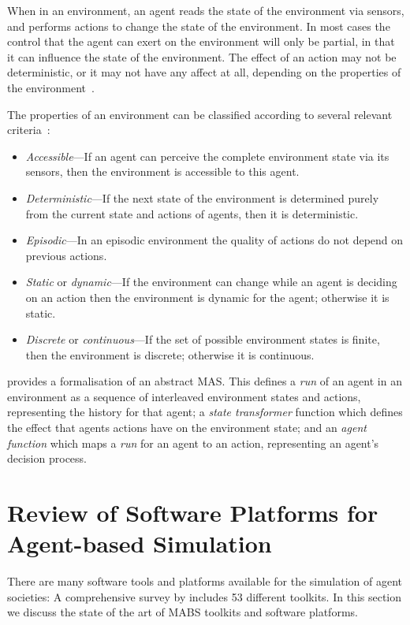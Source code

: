 When in an environment, an agent reads the state of the environment via sensors, and performs actions to change the state of the environment. In most cases the control that the agent can exert on the environment will only be partial, in that it can influence the state of the environment. The effect of an action may not be deterministic, or it may not have any affect at all, depending on the properties of the environment~\citep{Wooldridge2002}.

The properties of an environment can be classified according to several relevant criteria~\citep[p.46]{Russell2003}:
\begin{itemize}
\item \emph{Accessible}---If an agent can perceive the complete environment state via its sensors, then the environment is accessible to this agent.
\item \emph{Deterministic}---If the next state of the environment is determined purely from the current state and actions of agents, then it is deterministic.
\item \emph{Episodic}---In an episodic environment the quality of actions do not depend on previous actions.
\item \emph{Static} or \emph{dynamic}---If the environment can change while an agent is deciding on an action then the environment is dynamic for the agent; otherwise it is static.
\item \emph{Discrete} or \emph{continuous}---If the set of possible environment states is finite, then the environment is discrete; otherwise it is continuous.
\end{itemize}

\citet[pp.31--32]{Wooldridge2002} provides a formalisation of an abstract \ac{MAS}. This defines a \emph{run} of an agent in an environment as a sequence of interleaved environment states and actions, representing the history for that agent; a \emph{state transformer} function which defines the effect that agents actions have on the environment state; and an \emph{agent function} which maps a \emph{run} for an agent to an action, representing an agent's decision process.


\section{Review of Software Platforms for Agent-based Simulation}\label{sec:p2:review}

There are many software tools and platforms available for the simulation of agent societies: A comprehensive survey by \citet{CynthiaNikolaiandGregoryMadey2009} includes 53 different toolkits. In this section we discuss the state of the art of \ac{MABS} toolkits and software platforms.

